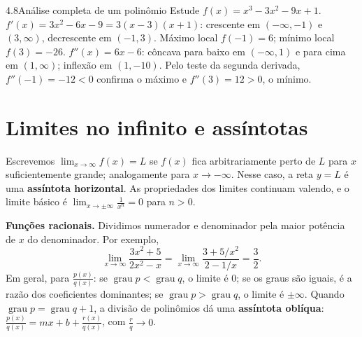 \begin{exemplo}{4.8}{Análise completa de um polinômio}
Estude $f(x)=x^3-3x^2-9x+1$.
\solucao
$f'(x)=3x^2-6x-9=3(x-3)(x+1)$: crescente em $(-\infty,-1)$ e $(3,\infty)$, decrescente em
$(-1,3)$. Máximo local $f(-1)=6$; mínimo local $f(3)=-26$.
$f''(x)=6x-6$: côncava para baixo em $(-\infty,1)$ e para cima em $(1,\infty)$; inflexão em
$(1,-10)$. Pelo teste da segunda derivada, $f''(-1)=-12<0$ confirma o máximo e $f''(3)=12>0$,
o mínimo.
\end{exemplo}

\section{Limites no infinito e assíntotas}

Escrevemos $\lim_{x\to\infty}f(x)=L$ se $f(x)$ fica arbitrariamente perto de $L$ para $x$
suficientemente grande; analogamente para $x\to-\infty$. Nesse caso, a reta $y=L$ é uma
\textbf{assíntota horizontal}. As propriedades dos limites continuam valendo, e o limite
básico é $\lim_{x\to\pm\infty}\frac1{x^n}=0$ para $n>0$.

\textbf{Funções racionais.} Dividimos numerador e denominador pela maior potência de $x$ do
denominador. Por exemplo,
\[
\lim_{x\to\infty}\frac{3x^2+5}{2x^2-x}=\lim_{x\to\infty}\frac{3+5/x^2}{2-1/x}=\frac32 .
\]
Em geral, para $\frac{p(x)}{q(x)}$: se $\operatorname{grau}p<\operatorname{grau}q$, o limite
é $0$; se os graus são iguais, é a razão dos coeficientes dominantes; se
$\operatorname{grau}p>\operatorname{grau}q$, o limite é $\pm\infty$. Quando
$\operatorname{grau}p=\operatorname{grau}q+1$, a divisão de polinômios dá uma
\textbf{assíntota oblíqua}: $\frac{p(x)}{q(x)}=mx+b+\frac{r(x)}{q(x)}$, com
$\frac{r}{q}\to0$.


